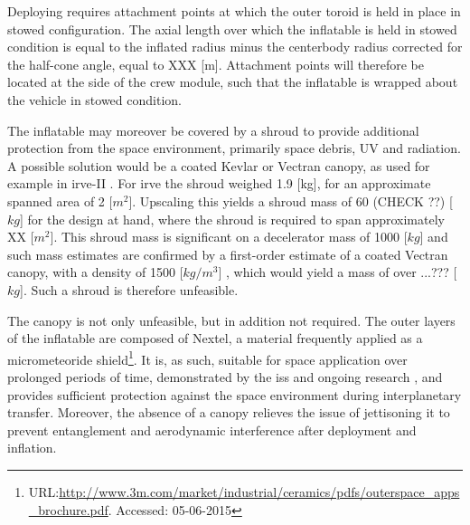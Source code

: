 Deploying requires attachment points at which the outer toroid is held in place in stowed configuration. The axial length over which the inflatable is held in stowed condition is equal to the inflated radius minus the centerbody radius corrected for the half-cone angle, equal to XXX [m]. Attachment points will therefore be located at the side of the crew module, such that the inflatable is wrapped about the vehicle in stowed condition. 

The inflatable may moreover be covered by a shroud to provide additional protection from the space environment, primarily space debris, UV and radiation. A possible solution would be a coated Kevlar or Vectran canopy, as used for example in \gls{irve}-II \cite{Dillman2010}. For \gls{irve} the shroud weighed 1.9 [kg], for an approximate spanned area of 2 [$m^{2}$]. Upscaling this yields a shroud mass of 60 (CHECK ??) [$kg$] for the design at hand, where the shroud is required to span approximately XX [$m^{2}$]. This shroud mass is significant on a decelerator mass of 1000 [$kg$] and such mass estimates are confirmed by a first-order estimate of a coated Vectran canopy, with a density of 1500 [$kg/m^{3}$] \cite{Miller2014}, which would yield a mass of over ...??? [$kg$]. Such a shroud is therefore unfeasible.

The canopy is not only unfeasible, but in addition not required. The outer layers of the inflatable are composed of Nextel, a material frequently applied as a micrometeoride shield\footnote{URL:\url{http://www.3m.com/market/industrial/ceramics/pdfs/outerspace_apps_brochure.pdf}. Accessed: 05-06-2015}. It is, as such, suitable for space application over prolonged periods of time, demonstrated by the \gls{iss} and ongoing research \cite{Thoma2005}, and provides sufficient protection against the space environment during interplanetary transfer. Moreover, the absence of a canopy relieves the issue of jettisoning it to prevent entanglement and aerodynamic interference after deployment and inflation.



